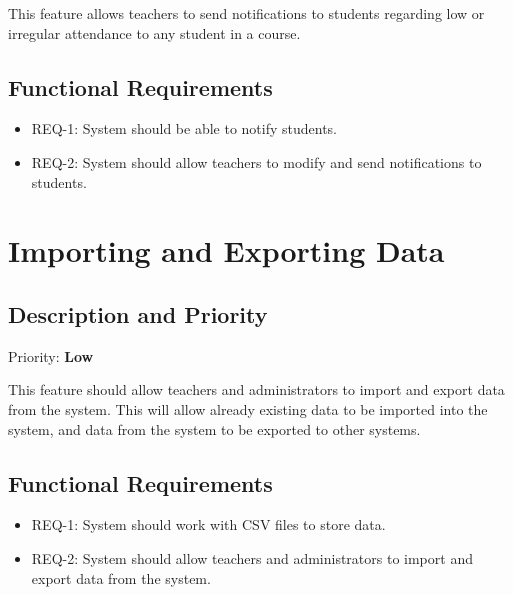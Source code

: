 \documentclass{scrreprt}
\begin{document}
This feature allows teachers to send notifications to students regarding low or irregular attendance to any student in a course.

\subsection{Functional Requirements}
\begin{itemize}
    \item REQ-1: System should be able to notify students.
\item REQ-2: System should allow teachers to modify and send notifications to students.
\end{itemize}

\section{Importing and Exporting Data}
\subsection{Description and Priority}
Priority: \textbf{Low}

This feature should allow teachers and administrators to import and export data from the system.
This will allow already existing data to be imported into the system, and data from the system to be exported to other systems.

\subsection{Functional Requirements}
\begin{itemize}
    \item REQ-1: System should work with CSV files to store data.
    \item REQ-2: System should allow teachers and administrators to import and export data from the system.
\end{itemize}
\end{document}
